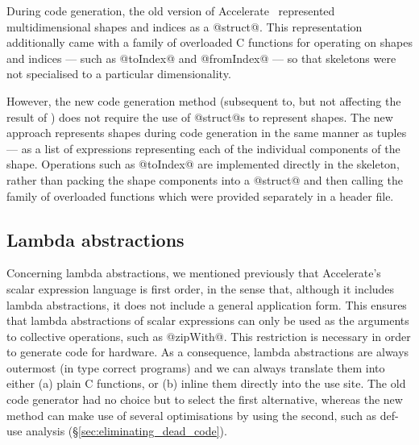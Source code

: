 During code generation, the old version of Accelerate~\cite{Chakravarty:2011fr}
represented multidimensional shapes and indices as a @struct@.
%
%
This representation additionally came with a family of overloaded C functions
for operating on shapes and indices --- such as @toIndex@ and
@fromIndex@ --- so that skeletons were not specialised to a particular
dimensionality.
%

However, the new code generation method (subsequent to, but not affecting the
result of \cite{CliftonEverest:2014vi}) does not require the use of
@struct@s to represent shapes. The new approach represents shapes during
code generation in the same manner as tuples --- as a list of expressions
representing each of the individual components of the shape. Operations such as
@toIndex@ are implemented directly in the skeleton, rather than packing the
shape components into a @struct@ and then calling the family of overloaded
functions which were provided separately in a header file.


\subsection{Lambda abstractions}

Concerning lambda abstractions, we mentioned previously that Accelerate's scalar
expression language is first order, in the sense that, although it includes
lambda abstractions, it does not include a general application form. This
ensures that lambda abstractions of scalar expressions can only be used as the
arguments to collective operations, such as @zipWith@. This restriction is
necessary in order to generate code for \GPU hardware. As a consequence, lambda
abstractions are always outermost (in type correct programs) and we can always
translate them into either (a) plain C functions, or (b) inline them directly
into the use site. The old code generator had no choice but to select the first
alternative, whereas the new method can make use of several optimisations by
using the second, such as def-use analysis (\S\ref{sec:eliminating_dead_code}).

